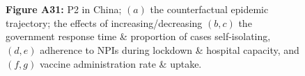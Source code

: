 \documentclass[paper=a4,fontsize=11pt]{article}
\begin{document}
\begin{figure}[!h]
  \\
  \hspace{1.76cm}
  \\
  \caption*{\textbf{Figure A31:} P2 in China; $(a)$ the counterfactual epidemic trajectory; the effects of increasing/decreasing $(b,c)$ the government response time \& proportion of cases self-isolating, $(d,e)$ adherence to NPIs during lockdown \& hospital capacity, and $(f,g)$ vaccine administration rate \& uptake.}
\end{figure}
\end{document}
